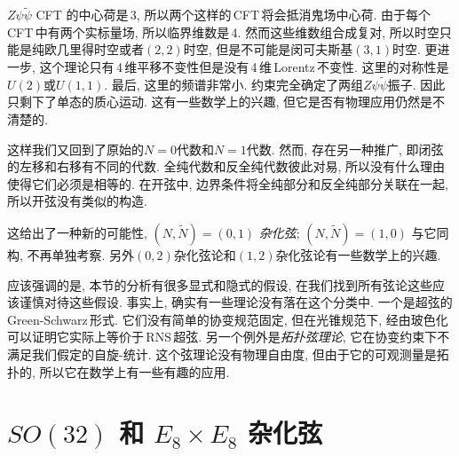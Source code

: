 $Z\psi\tilde{\psi} $ CFT 的中心荷是\,3, 所以两个这样的\,CFT\,将会抵消鬼场中心荷. 由于每个\,CFT\,中有两个实标量场, 所以临界维数是\,4. 然而这些维数组合成复对, 所以时空只能是纯欧几里得时空或者$ (2,2) $时空, 但是不可能是闵可夫斯基$ (3,1) $时空. 更进一步, 这个理论只有\,4\,维平移不变性但是没有\,4\,维\,Lorentz\,不变性. 这里的对称性是$ U(2) $或$ U(1,1)$. 最后, 这里的频谱非常小. 约束完全确定了两组$ Z\psi\tilde{\psi} $振子. 因此只剩下了单态的质心运动. 这有一些数学上的兴趣, 但它是否有物理应用仍然是不清楚的.

这样我们又回到了原始的$ N=0 $代数和$ N=1 $代数. 然而, 存在另一种推广, 即闭弦的左移和右移有不同的代数. 全纯代数和反全纯代数彼此对易, 所以没有什么理由使得它们必须是相等的. 在开弦中, 边界条件将全纯部分和反全纯部分关联在一起, 所以开弦没有类似的构造.

这给出了一种新的可能性, $(N,\tilde{N})=(0,1)$ {\emph{杂化弦}}; $(N,\tilde{N})=(1,0)$ 与它同构, 不再单独考察. 另外$ (0,2) $杂化弦论和$ (1,2) $杂化弦论有一些数学上的兴趣.

应该强调的是, 本节的分析有很多显式和隐式的假设, 在我们找到所有弦论这些应该谨慎对待这些假设. 事实上, 确实有一些理论没有落在这个分类中. 一个是超弦的\,Green-Schwarz\,形式. 它们没有简单的协变规范固定, 但在光锥规范下, 经由玻色化可以证明它实际上等价于\,RNS\,超弦. 另一个例外是{\emph{拓扑弦理论}}, 它在协变约束下不满足我们假定的自旋-统计. 这个弦理论没有物理自由度, 但由于它的可观测量是拓扑的, 所以它在数学上有一些有趣的应用.




\section{\texorpdfstring{$SO(32)$ 和 $E_{8}\times E_{8}$ 杂化弦}{The SO(32) and E8 X E8 heterotic strings}}

